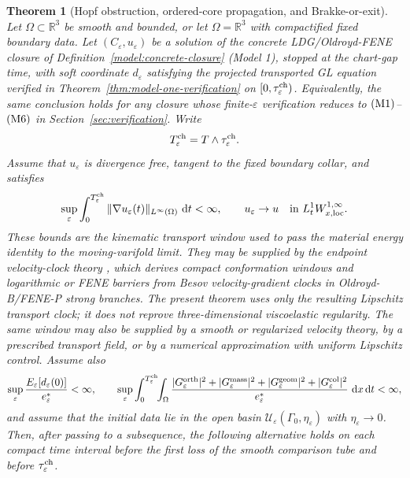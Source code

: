 \documentclass[11pt]{article}
\newtheorem{theorem}{Theorem}[section]
\theoremstyle{definition}
\newcommand{\R}{\mathbb R}
\newcommand{\dd}{\,\mathrm d}
\newcommand{\eps}{\varepsilon}
\newcommand{\estar}{e_\varepsilon^\ast}
\begin{document}
\begin{theorem}[Hopf obstruction, ordered-core propagation, and Brakke-or-exit]
\label{thm:short-main}
Let \(\Omega\subset\R^3\) be smooth and bounded, or let
\(\Omega=\R^3\) with compactified fixed boundary data.  Let
\((C_\eps,u_\eps)\) be a solution of the concrete LDG/Oldroyd-FENE closure of
Definition~\ref{model:concrete-closure} (Model 1), stopped at the chart-gap
time, with soft
coordinate \(d_\eps\) satisfying the projected transported GL equation
verified in Theorem~\ref{thm:model-one-verification} on
\([0,\tau_\eps^{\rm ch})\).  Equivalently, the same conclusion holds for any
closure whose finite-\(\eps\) verification reduces to \({\rm (M1)}\)--\({\rm
(M6)}\) in Section~\ref{sec:verification}.  Write
\[
        T_\eps^{\rm ch}=T\wedge\tau_\eps^{\rm ch}.
\]
Assume that \(u_\eps\) is divergence free, tangent to the fixed boundary collar,
and satisfies
\[
        \sup_\eps
        \int_0^{T_\eps^{\rm ch}}
        \|\nabla u_\eps(t)\|_{L^\infty(\Omega)}\,\dd t<\infty,
        \qquad
        u_\eps\to u
        \quad\hbox{in }L^1_tW^{1,\infty}_{x,{\rm loc}} .
\]
These bounds are the kinematic transport window used to pass the material
energy identity to the moving-varifold limit.  They may be supplied by the
endpoint velocity-clock theory \cite{PengBlowUp2026,PengPositiveCone3D2026},
which derives compact conformation windows and logarithmic or FENE barriers
from Besov velocity-gradient clocks in Oldroyd-B/FENE-P strong branches.  The
present theorem uses only the resulting Lipschitz transport clock; it does not
reprove three-dimensional viscoelastic regularity.  The same window may also be
supplied by a smooth or regularized velocity theory, by a prescribed transport
field, or by a numerical approximation with uniform Lipschitz control.
Assume also
\[
        \sup_\eps
        \frac{E_\eps[d_\eps(0)]}{\estar}
        <\infty,\qquad
        \sup_\eps
        \int_0^{T_\eps^{\rm ch}}\!\!\int_\Omega
        \frac{|G_\eps^{\rm orth}|^2+|G_\eps^{\rm mass}|^2
        +|G_\eps^{\rm geom}|^2+|G_\eps^{\rm col}|^2}{\estar}\,\dd x\dd t
        <\infty,
\]
and assume that the initial data lie in the open basin
\(\mathcal U_\eps(\Gamma_0,\eta_\eps)\) with \(\eta_\eps\to0\).
Then, after passing to a subsequence, the following alternative holds on
each compact time interval before the first loss of the smooth comparison tube
and before \(\tau_\eps^{\rm ch}\).


\end{theorem}
\end{document}
